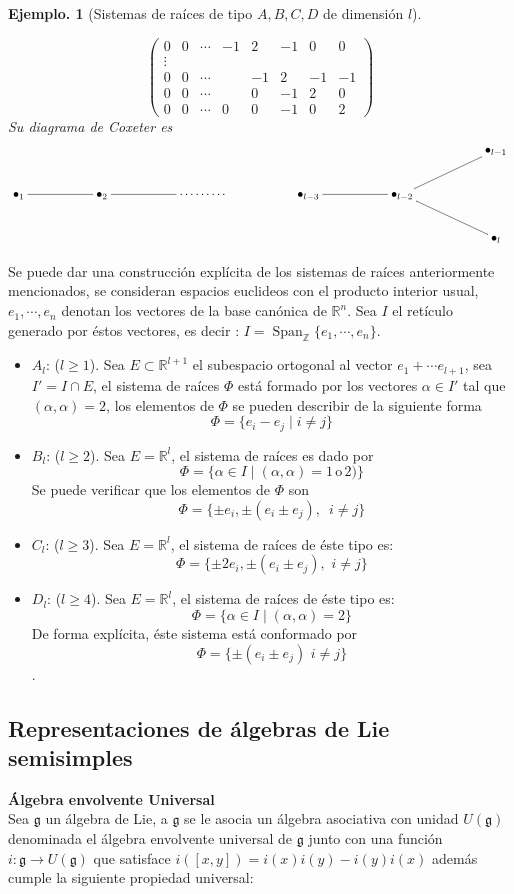 \documentclass[11pt,a4paper]{article}
\newtheorem{example}{Ejemplo.}
\newcommand{\Span}{\operatorname{Span}}
\newcommand{\mfg}{\mathfrak{g}}
\newcommand{\suchthat}{\mid}
\begin{document}
\begin{example}[Sistemas de raíces de tipo $A,B,C,D$ de dimensión $l$]
\begin{enumerate}
$$\begin{pmatrix}
     0 & 0 & \cdots  &-1 & 2 &-1 & 0 & 0\\
    \vdots & \\
    0 &0 & \cdots & & -1 & 2 & -1 &-1 \\
    0 & 0 & \cdots & & 0 &-1 &2 &0 \\
    0 & 0 &\cdots &0 & 0  & -1 & 0 & 2\end{pmatrix}$$
    Su diagrama de Coxeter es 
      $$\xymatrix{  && && && && && \bullet_{l-1} \\
      \bullet_1\ar@{-}[rr] && \bullet_2\ar@{-}[rr] &&\cdots  \cdots \cdots && \bullet_{l-3}\ar@{-}[rr] && \bullet_{l-2} \ar@{-}[urr] \ar@{-}[drr]    &&  \\
       && && && && && \bullet_l}$$
\end{enumerate}
\end{example}

Se puede dar una construcción explícita de los sistemas de raíces  anteriormente mencionados, se consideran espacios euclideos con el producto interior usual, $e_1, \cdots, e_n$ denotan  los vectores de  la base canónica de $\mathbb{R}^n$. Sea  $I$ el  retículo generado por éstos vectores, es decir : $I=\Span_{\mathbb{Z}} \{e_1, \cdots, e_n \}$.
\begin{itemize}
    \item $A_l$: ($l\geq 1$). Sea $E\subset \mathbb{R}^{l+1}$ el subespacio ortogonal al vector $e_1+ \cdots e_{l+1}$, sea $I'= I \cap E$, el sistema de raíces $\Phi$ está formado por los vectores $\alpha \in I'$ tal que $(\alpha, \alpha)=2$, los elementos de $\Phi$ se pueden describir de la siguiente forma
    $$\Phi= \{ e_i - e_j \suchthat i \neq j\} $$
    \item $B_l$: ($l \geq 2$). Sea $E=\mathbb{R}^l$, el sistema de raíces es dado por
    $$\Phi=\{ \alpha \in I \suchthat (\alpha,\alpha)=1 \, \mbox{o}\, 2)\} $$
    Se puede verificar que los elementos de $\Phi$ son
    $$\Phi=\{\pm e_i, \pm(e_i \pm e_j), \, \,  \, i\neq j \} $$
    \item $C_l$: ($l \geq 3$). Sea $E=\mathbb{R}^l$, el sistema de raíces de éste tipo es:
    $$\Phi=\{\pm 2e_i, \pm (e_i \pm e_j) , \, \, i\neq j\} $$
    \item $D_l$: ($l \geq 4$). Sea $E=\mathbb{R}^l$, el sistema de raíces de éste tipo es:
    $$\Phi= \{\alpha\in I \suchthat (\alpha, \alpha)=2 \} $$
    De forma explícita, éste sistema está conformado por
    $$\Phi= \{\pm (e_i \pm e_j) \, \, i\neq j \} $$.
\end{itemize}
\subsection{Representaciones de álgebras de Lie semisimples}
\textbf{Álgebra envolvente Universal}\\
Sea $\mfg$ un álgebra de Lie, a $\mfg$ se le asocia un álgebra asociativa con unidad $U(\mfg)$ denominada el álgebra envolvente universal  de $\mfg$ junto con una función $i: \mfg \rightarrow U(\mfg)$ que satisface $i([x,y])= i(x)i(y)-i(y)i(x)$ además cumple la siguiente propiedad universal:
\end{document}

